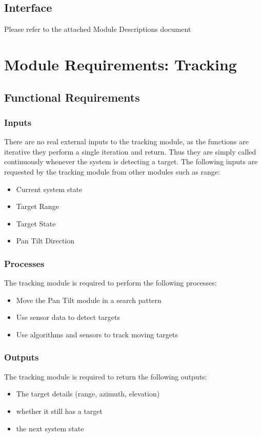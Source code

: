 \documentclass[]{report}
\begin{document}
\subsection{Interface}
Please refer to the attached Module Descriptions document

\section{Module Requirements: Tracking}
\subsection{Functional Requirements}
\subsubsection{Inputs}
There are no real external inputs to the tracking module, as the functions are iterative they perform a single iteration and return. Thus they are simply called continuously whenever the system is detecting a target. The following inputs are requested by the tracking module from other modules such as range:
\begin{itemize}
	\item Current system state
	\item Target Range
	\item Target State
	\item Pan Tilt Direction
\end{itemize}

\subsubsection{Processes}
The tracking module is required to perform the following processes:
\begin{itemize}
	\item Move the Pan Tilt module in a search pattern
	\item Use sensor data to detect targets
	\item Use algorithms and sensors to track moving targets
\end{itemize}

\subsubsection{Outputs}
The tracking module is required to return the following outputs:
\begin{itemize}
	\item The target details (range, azimuth, elevation)
	\item whether it still has a target
	\item the next system state
\end{itemize}
\end{document}
